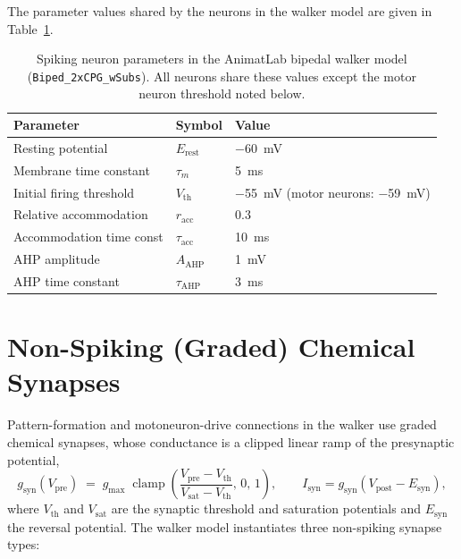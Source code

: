 The parameter values shared by the neurons in the walker model are given in
Table~\ref{tab:app_neuron}.

\begin{table}[htbp]
\caption{Spiking neuron parameters in the AnimatLab bipedal walker model
(\texttt{Biped\_2xCPG\_wSubs}). All neurons share these values except the motor
neuron threshold noted below.}
\label{tab:app_neuron}
\begin{tabular}{@{}lll@{}}
\toprule
\textbf{Parameter} & \textbf{Symbol} & \textbf{Value} \\
\midrule
Resting potential        & $E_{\text{rest}}$   & \qty{-60}{\mV} \\
Membrane time constant   & $\tau_{m}$          & \qty{5}{\ms}   \\
Initial firing threshold & $V_{\text{th}}$     & \qty{-55}{\mV} (motor neurons: \qty{-59}{\mV}) \\
Relative accommodation   & $r_{\text{acc}}$    & 0.3            \\
Accommodation time const & $\tau_{\text{acc}}$ & \qty{10}{\ms}  \\
AHP amplitude            & $A_{\text{AHP}}$    & \qty{1}{\mV}   \\
AHP time constant        & $\tau_{\text{AHP}}$ & \qty{3}{\ms}   \\
\bottomrule
\end{tabular}
\end{table}

\section{Non-Spiking (Graded) Chemical Synapses}

Pattern-formation and motoneuron-drive connections in the walker use graded
chemical synapses, whose conductance is a clipped linear ramp of the presynaptic
potential,
\begin{equation}
    g_{\text{syn}}(V_{\text{pre}})
    \;=\; g_{\text{max}}\;
    \operatorname{clamp}\!\left(
        \frac{V_{\text{pre}} - V_{\text{th}}}{V_{\text{sat}} - V_{\text{th}}},
        \,0,\,1\right),
    \qquad
    I_{\text{syn}} = g_{\text{syn}}\left(V_{\text{post}} - E_{\text{syn}}\right),
    \label{eq:app_nonsyn}
\end{equation}
where $V_{\text{th}}$ and $V_{\text{sat}}$ are the synaptic threshold and
saturation potentials and $E_{\text{syn}}$ the reversal potential. The walker
model instantiates three non-spiking synapse types:

